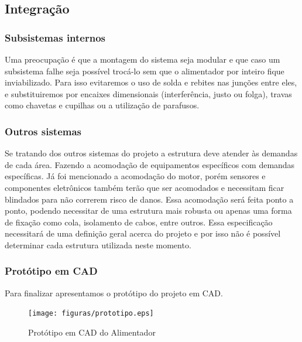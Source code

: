 \subsection{Integração}

\subsubsection{Subsistemas internos}

Uma preocupação é que a montagem do sistema seja modular e que caso um subsistema falhe seja possível trocá-lo sem que o alimentador por inteiro fique inviabilizado. Para isso evitaremos o uso de solda e rebites nas junções entre eles, e substituiremos por encaixes dimensionais (interferência, justo ou folga), travas como chavetas e cupilhas ou a utilização de parafusos.

\subsubsection{Outros sistemas}

Se tratando dos outros sistemas do projeto a estrutura deve atender às demandas de cada área. Fazendo a acomodação de equipamentos específicos com demandas específicas. Já foi mencionado a acomodação do motor, porém sensores e componentes eletrônicos também terão que ser acomodados e necessitam ficar blindados para não correrem risco de danos. Essa acomodação será feita ponto a ponto, podendo necessitar de uma estrutura mais robusta ou apenas uma forma de fixação como cola, isolamento de cabos, entre outros. Essa especificação necessitará de uma definição geral acerca do projeto e por isso não é possível determinar cada estrutura utilizada neste momento.

\subsubsection{Protótipo em CAD}

Para finalizar apresentamos o protótipo do projeto em CAD.

\begin{figure}[H]
 \centering
   \texttt{[image: figuras/prototipo.eps]}
 \caption{Protótipo em CAD do Alimentador}
 \label{prototipo}
\end{figure}
